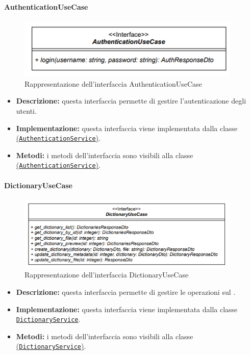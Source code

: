 
\paragraph{AuthenticationUseCase} \label{AuthenticationUseCase}
\begin{figure}[H]
    \centering
    \includegraphics[width=0.95\textwidth]{assets/Backend/authentication_use_case.png}
    \caption{Rappresentazione dell'interfaccia AuthenticationUseCase}
  \end{figure}
\begin{itemize}
    \item \textbf{Descrizione:} questa interfaccia permette di gestire l'autenticazione degli utenti. 
    \item \textbf{Implementazione:} questa interfaccia viene implementata dalla classe \hyperref[AuthenticationService]{(\texttt{AuthenticationService})}. 
    \item \textbf{Metodi:} i metodi dell'interfaccia sono visibili alla classe \hyperref[AuthenticationService]{(\texttt{AuthenticationService})}.
\end{itemize}  

\paragraph{DictionaryUseCase} \label{DictionaryUseCase}
\begin{figure}[H]
    \centering
    \includegraphics[width=0.95\textwidth]{assets/Backend/dictionary_use_case.png}
    \caption{Rappresentazione dell'interfaccia DictionaryUseCase}
  \end{figure}
\begin{itemize}
    \item \textbf{Descrizione:} questa interfaccia permette di gestire le operazioni sul .
    \item \textbf{Implementazione:} questa interfaccia viene implementata dalla classe \hyperref[DictionaryService]{\texttt{DictionaryService}}.
    \item \textbf{Metodi:} i metodi dell'interfaccia sono visibili alla classe \hyperref[DictionaryService]{(\texttt{DictionaryService})}.
\end{itemize}  

